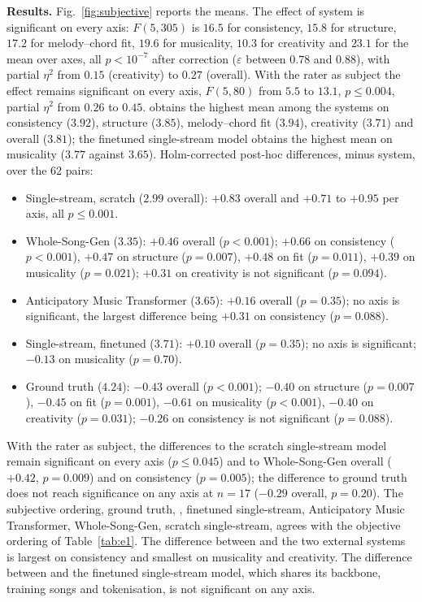 \textbf{Results.} Fig.~\ref{fig:subjective} reports the means. The
effect of system is significant on every axis: $F(5, 305)$ is $16.5$
for consistency, $15.8$ for structure, $17.2$ for melody--chord fit,
$19.6$ for musicality, $10.3$ for creativity and $23.1$ for the mean
over axes, all $p < 10^{-7}$ after correction ($\varepsilon$ between
$0.78$ and $0.88$), with partial $\eta^2$ from $0.15$ (creativity) to
$0.27$ (overall). With the rater as subject the effect remains
significant on every axis, $F(5, 80)$ from $5.5$ to $13.1$, $p \le
0.004$, partial $\eta^2$ from $0.26$ to $0.45$. \sys obtains the
highest mean among the systems on consistency ($3.92$), structure
($3.85$), melody--chord fit ($3.94$), creativity ($3.71$) and overall
($3.81$); the finetuned single-stream model obtains the highest mean on
musicality ($3.77$ against $3.65$). Holm-corrected post-hoc
differences, \sys minus system, over the 62 pairs:
\begin{itemize}
  \item Single-stream, scratch ($2.99$ overall): $+0.83$ overall and
    $+0.71$ to $+0.95$ per axis, all $p \le 0.001$.
  \item Whole-Song-Gen ($3.35$): $+0.46$ overall ($p < 0.001$);
    $+0.66$ on consistency ($p < 0.001$), $+0.47$ on structure
    ($p = 0.007$), $+0.48$ on fit ($p = 0.011$), $+0.39$ on musicality
    ($p = 0.021$); $+0.31$ on creativity is not significant
    ($p = 0.094$).
  \item Anticipatory Music Transformer ($3.65$): $+0.16$ overall
    ($p = 0.35$); no axis is significant, the largest difference being
    $+0.31$ on consistency ($p = 0.088$).
  \item Single-stream, finetuned ($3.71$): $+0.10$ overall
    ($p = 0.35$); no axis is significant; $-0.13$ on musicality
    ($p = 0.70$).
  \item Ground truth ($4.24$): $-0.43$ overall ($p < 0.001$);
    $-0.40$ on structure ($p = 0.007$), $-0.45$ on fit ($p = 0.001$),
    $-0.61$ on musicality ($p < 0.001$), $-0.40$ on creativity
    ($p = 0.031$); $-0.26$ on consistency is not significant
    ($p = 0.088$).
\end{itemize}
With the rater as subject, the differences to the scratch single-stream
model remain significant on every axis ($p \le 0.045$) and to
Whole-Song-Gen overall ($+0.42$, $p = 0.009$) and on consistency
($p = 0.005$); the difference to ground truth does not reach
significance on any axis at $n = 17$ ($-0.29$ overall, $p = 0.20$).
The subjective ordering, ground truth, \sys, finetuned single-stream,
Anticipatory Music Transformer, Whole-Song-Gen, scratch single-stream,
agrees with the objective ordering of Table~\ref{tab:e1}. The
difference between \sys and the two external systems is largest on
consistency and smallest on musicality and creativity. The difference
between \sys and the finetuned single-stream model, which shares its
backbone, training songs and tokenisation, is not significant on any
axis.
